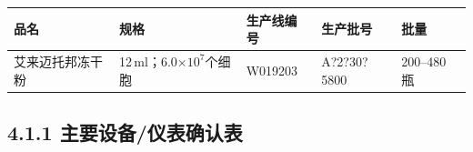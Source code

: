 \documentclass[UTF8,10pt,a4paper,fontset=fandol]{ctexart}
\newcommand{\fieldvalue}[1]{#1}
\newcommand{\handwritten}[1]{#1}
\begin{document}
\begin{center}
\begin{tabular}{|p{2.6cm}|p{3.3cm}|p{3.4cm}|p{3.0cm}|}
\hline
品名 & 规格 & 生产线编号 & 生产批号 & 批量 \\ \hline
\fieldvalue{艾来迈托邦冻干粉}
&
\fieldvalue{12\,ml；6.0$\times 10^{7}$个细胞}
&
\fieldvalue{\handwritten{W019203}}
&
\fieldvalue{\handwritten{A?2?30?5800}}
&
\fieldvalue{200--480 瓶}
\\ \hline
\end{tabular}
\end{center}

\subsection*{4.1.1 主要设备/仪表确认表}
\end{document}
